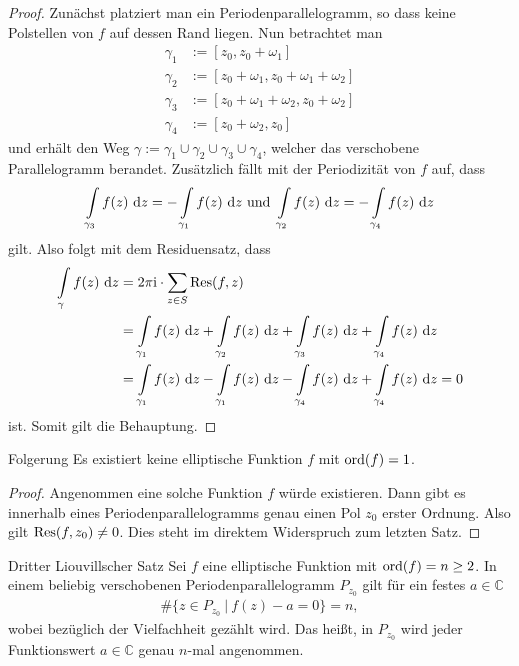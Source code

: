 \begin{proof}
Zunächst platziert man ein Periodenparallelogramm,
so dass keine Polstellen von $f$ auf dessen Rand liegen.
Nun betrachtet man
\begin{align*}
\gamma_1 &:= [z_0,z_0+\omega_1]\\
\gamma_2 &:= [z_0+\omega_1,z_0+\omega_1+\omega_2]\\
\gamma_3 &:= [z_0+\omega_1+\omega_2,z_0+\omega_2]\\
\gamma_4 &:= [z_0+\omega_2,z_0]
\end{align*}
und erhält den Weg 
$\gamma := \gamma_1 \cup \gamma_2 \cup \gamma_3 \cup \gamma_4$,
welcher das verschobene Parallelogramm berandet.
Zusätzlich fällt mit der Periodizität von $f$ auf, dass 
\begin{align*}
\int \limits_{\gamma_3} f(z) \ \td{z} = -\int \limits_{\gamma_1} f(z) \ \td{z}
\ \text{und} \
\int \limits_{\gamma_2} f(z) \ \td{z} = -\int \limits_{\gamma_4} f(z) \ \td{z}
\end{align*}
gilt.
Also folgt mit dem Residuensatz, dass
\begin{align*}
\int \limits_\gamma f(z) \ \text{\rmfamily d} z
&= 2 \pi  \mathrm{i}  \cdot \sum \limits_{z \in S } \operatorname{Res}(f,z)\\
&= \int \limits_{\gamma_1} f(z) \ \text{\rmfamily d} z
+ \int \limits_{\gamma_2} f(z) \ \text{\rmfamily d} z
+ \int \limits_{\gamma_3} f(z) \ \text{\rmfamily d} z
+ \int \limits_{\gamma_4} f(z) \ \text{\rmfamily d} z\\
&= \int \limits_{\gamma_1} f(z) \ \text{\rmfamily d} z
- \int \limits_{\gamma_1} f(z) \ \text{\rmfamily d} z
- \int \limits_{\gamma_4} f(z) \ \text{\rmfamily d} z
+ \int \limits_{\gamma_4} f(z) \ \text{\rmfamily d} z
= 0
\end{align*}
ist. 
Somit gilt die Behauptung.
\end{proof}

\begin{bla}{Folgerung}\label{2.4}
Es existiert keine elliptische Funktion $f$ mit $\operatorname{ord}(f) = 1$.
\end{bla}
\begin{proof}
Angenommen eine solche Funktion $f$ würde existieren.
Dann gibt es innerhalb eines Periodenparallelogramms
genau einen Pol $z_0$ erster Ordnung. Also gilt $\operatorname{Res}(f,z_0) \neq 0$.
Dies steht im direktem Widerspruch zum letzten Satz.
\end{proof}

\begin{bla}{Dritter Liouvillscher Satz}\label{2.5}
Sei $f$ eine elliptische Funktion mit $\operatorname{ord}(f) = n \geq 2$. In einem beliebig verschobenen Periodenparallelogramm $P_{z_0}$ gilt für ein festes $a \in \mathbb{C}$
\begin{align*}
\# \lbrace z \in P_{z_0} \ | \ f(z) - a = 0   \rbrace  = n,
\end{align*}
wobei bezüglich der Vielfachheit gezählt wird.
Das heißt, in $P_{z_0}$ wird jeder Funktionswert $a \in \mathbb{C}$ genau $n$-mal 
angenommen.
\end{bla}

